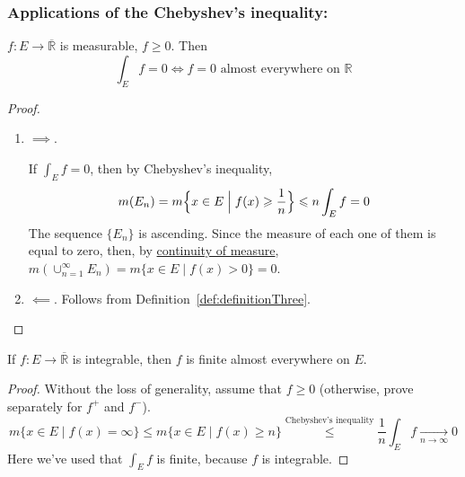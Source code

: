 \subsubsection*{Applications of the Chebyshev's inequality:}
\begin{proposition}
    $f : E \to \overline{\mathbb{R}}$ is measurable, $f \ge 0$.
    Then \[ \int_E f = 0 \iff f = 0 \text{ almost everywhere on } \mathbb{R} \]
\end{proposition}
\begin{proof}\mbox{}
    \begin{enumerate}
        \item {
            $\implies$.

            If $\int_E f = 0$, then by Chebyshev's inequality,
            \[ m(E_n) = m\Bigl\{x \in E \mathrel{\Big\vert} f(x) \ge \frac{1}{n} \Bigr\}  \le n \int_E f = 0 \]
            The sequence $\{E_n\}$ is ascending. Since the measure of each one of them
            is equal to zero, then, by \hyperref[the:continuityOfMeasure]{continuity of measure},
            $m(\cup_{n=1}^\infty E_n) = m\{x \in E \mid f(x) > 0 \} = 0$.
        }
        \item {
            $\impliedby$. Follows from Definition~\ref{def:definitionThree}.
        }
    \end{enumerate}
\end{proof}

\begin{proposition}
    If $f: E \to \overline{\mathbb{R}}$ is integrable, then $f$ is finite
    almost everywhere on $E$.
\end{proposition}
\begin{proof}
    Without the loss of generality, assume that $f \ge 0$
    (otherwise, prove separately for $f^+$ and $f^-$).
    \[ 
        m\{x \in E \mid f(x) = \infty \} \le m\{x \in E \mid f(x) \ge n \} 
        \overset{\text{Chebyshev's inequality}}{\le} \frac{1}{n} \int_E f 
        \underset{n \to \infty}{\longrightarrow} 0
    \]
    Here we've used that $\int_E f$ is finite, because $f$ is integrable.
\end{proof}
